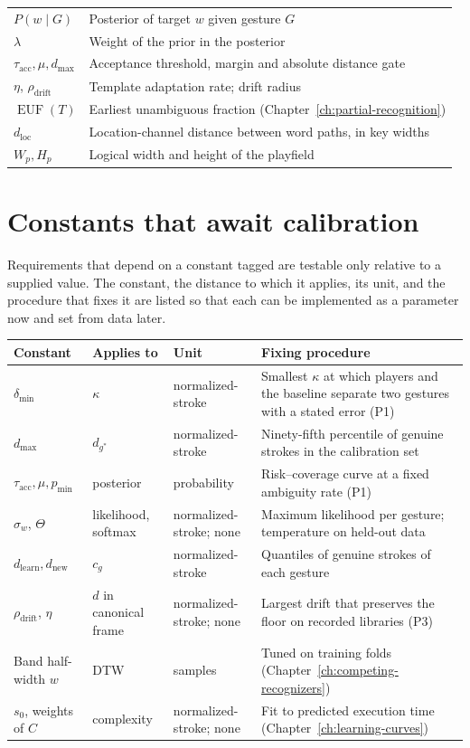 \begin{table}[h]
\begin{tabularx}{\textwidth}{@{}lX@{}}
$P(w\mid G)$ & Posterior of target $w$ given gesture $G$ \\
$\lambda$ & Weight of the prior in the posterior \\
$\tau_{\mathrm{acc}},\mu,d_{\max}$ & Acceptance threshold, margin and absolute distance gate \\
$\eta$, $\rho_{\mathrm{drift}}$ & Template adaptation rate; drift radius \\
$\operatorname{EUF}(T)$ & Earliest unambiguous fraction (Chapter~\ref{ch:partial-recognition}) \\
$d_{\mathrm{loc}}$ & Location-channel distance between word paths, in key widths \\
$W_p,H_p$ & Logical width and height of the playfield \\
\bottomrule
\end{tabularx}
\end{table}

\section*{Constants that await calibration}

Requirements that depend on a constant tagged \evC{} are testable only relative to a supplied value. The constant, the distance to which it applies, its unit, and the procedure that fixes it are listed so that each can be implemented as a parameter now and set from data later.

\begin{table}[h]
\centering
\small
\begin{tabularx}{\textwidth}{@{}lllX@{}}
\toprule
Constant & Applies to & Unit & Fixing procedure \\
\midrule
$\delta_{\min}$ & $\kappa$ & normalized-stroke & Smallest $\kappa$ at which players and the baseline separate two gestures with a stated error (P1) \\
$d_{\max}$ & $d_{g^\ast}$ & normalized-stroke & Ninety-fifth percentile of genuine strokes in the calibration set \\
$\tau_{\mathrm{acc}},\mu,p_{\min}$ & posterior & probability & Risk--coverage curve at a fixed ambiguity rate (P1) \\
$\sigma_w$, $\Theta$ & likelihood, softmax & normalized-stroke; none & Maximum likelihood per gesture; temperature on held-out data \\
$d_{\mathrm{learn}},d_{\mathrm{new}}$ & $c_g$ & normalized-stroke & Quantiles of genuine strokes of each gesture \\
$\rho_{\mathrm{drift}}$, $\eta$ & $d$ in canonical frame & normalized-stroke; none & Largest drift that preserves the floor on recorded libraries (P3) \\
Band half-width $w$ & DTW & samples & Tuned on training folds (Chapter~\ref{ch:competing-recognizers}) \\
$s_0$, weights of $C$ & complexity & normalized-stroke; none & Fit to predicted execution time (Chapter~\ref{ch:learning-curves}) \\
\bottomrule
\end{tabularx}
\end{table}

